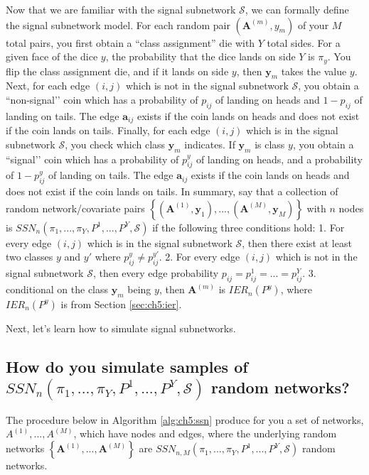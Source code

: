 Now that we are familiar with the signal subnetwork $\mathcal S$, we can formally define the signal subnetwork model. For each random pair $(\mathbf A^{(m)}, y_m)$ of your $M$ total pairs, you first obtain a ``class assignment'' die with $Y$ total sides. For a given face of the dice $y$, the probability that the dice lands on side $Y$ is $\pi_y$. You flip the class assignment die, and if it lands on side $y$, then $\mathbf y_m$ takes the value $y$. Next, for each edge $(i,j)$ which is not in the signal subnetwork $\mathcal S$, you obtain a ``non-signal’’ coin which has a probability of $p_{ij}$ of landing on heads and $1 - p_{ij}$ of landing on tails. The edge $\mathbf a_{ij}$ exists if the coin lands on heads and does not exist if the coin lands on tails. Finally, for each edge $(i, j)$ which is in the signal subnetwork $\mathcal S$, you check which class $\mathbf y_m$ indicates. If $\mathbf y_m$ is class $y$, you obtain a ``signal’’ coin which has a probability of $p_{ij}^y$ of landing on heads, and a probability of $1 - p_{ij}^y$ of landing on tails. The edge $\mathbf a_{ij}$ exists if the coin lands on heads and does not exist if the coin lands on tails. In summary, say that a collection of random network/covariate pairs $\left\{(\mathbf A^{(1)}, \mathbf y_1), ..., (\mathbf A^{(M)}, \mathbf y_M)\right\}$ with $n$ nodes is $SSN_n(\pi_1, ..., \pi_Y, P^1, ..., P^Y, \mathcal S)$ if the following three conditions hold:
1. For every edge $(i, j)$ which is in the signal subnetwork $\mathcal S$, then there exist at least two classes $y$ and $y'$ where $p_{ij}^y \neq p_{ij}^{y'}$.
2. For every edge $(i, j)$ which is not in the signal subnetwork $\mathcal S$, then every edge probability $p_{ij}=p_{ij}^1 =...= p_{ij}^Y$. 
3. conditional on the class $\mathbf y_m$ being $y$, then $\mathbf A^{(m)}$ is $IER_n(P^y)$, where $IER_n(P^y)$ is from Section \ref{sec:ch5:ier}.

Next, let's learn how to simulate signal subnetworks.
\subsection{How do you simulate samples of $SSN_n(\pi_1, ..., \pi_Y, P^1, ..., P^Y, \mathcal S)$ random networks?}

The procedure below in Algorithm \ref{alg:ch5:ssn} produce for you a set of networks, $A^{(1)}, ..., A^{(M)}$, which have nodes and edges, where the underlying random networks $\left\{\mathbf A^{(1)},..., \mathbf A^{(M)}\right\}$ are $SSN_{n,M}(\pi_1,..., \pi_Y, P^1,..., P^Y, \mathcal S)$ random networks.


